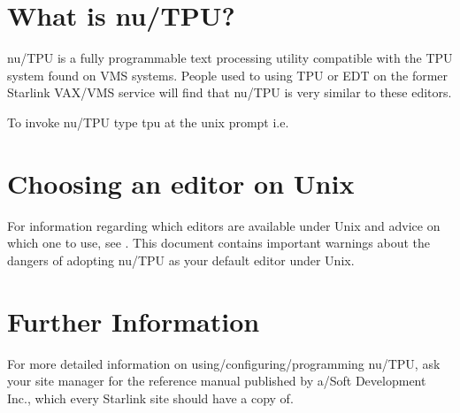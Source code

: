 \documentclass[11pt,nolof,noabs]{starlink}
\begin{document}
\scfrontmatter

\section{What is nu/TPU?}

nu/TPU is a fully programmable text processing utility compatible
with the TPU system found on VMS systems. People used to using
TPU or EDT on the former Starlink VAX/VMS service will find that
nu/TPU is very similar to these editors.

To invoke nu/TPU type tpu at the unix prompt i.e.

\begin{terminalv}
\end{terminalv}

\section{Choosing an editor on Unix}

For information regarding which editors are available under Unix and
advice on which one to use, see . This document contains
important warnings about the dangers of adopting nu/TPU as your default
editor under Unix.

\section{Further Information}

For more detailed information on using/configuring/programming nu/TPU,
ask your site manager for the reference manual published by a/Soft
Development Inc., which every Starlink site should have a copy of.
\end{document}
